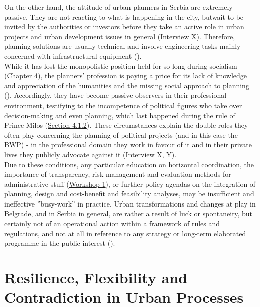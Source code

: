 \documentclass[11pt]{report}
\begin{document}
{{{On the other hand, the attitude of urban planners in Serbia are extremely passive. They are not reacting to what is happening in the city, butwait to be invited by the authorities or investors before they take an active role in urban projects and urban development issues in general 
(\href{InterviewX}{Interview X}).
Therefore, planning solutions are usually technical and involve engineering tasks mainly concerned with infrastructural equipment (\href{Stojkov}{\citealt{stojkov_teorijska_2012}}).
\\

While it has lost the monopolistic position held for so long during socialism (\href{Chapter 4}{Chapter 4}), the planners’ profession is paying a price for its lack of knowledge and appreciation of the humanities and the missing social approach to planning  (\href{Peric}{\citealt{peric_evolution_2016}}).
Accordingly, they have become passive observers in their professional environment, testifying to the incompetence of political figures who take over decision-making and even planning, which last happened during the rule of Prince Milos (\href{Section 4.1.2}{Section 4.1.2}).
These circumstances explain the double roles they often play concerning the planning of  political projects  (and in this case the BWP) - in the professional domain they work in favour of it and in their private lives they publicly advocate against it (\href{InterviewX}{Interview X, Y}).
\\

Due to these conditions, any particular education on horizontal coordination, the importance of transparency, risk management and evaluation methods for administrative stuff 
(\href{Expert Workshop}{Workshop 1}),
or further policy agendas on the integration of planning, design and cost-benefit and feasibility analyses, may be insufficient and ineffective ”busy-work” in practice. Urban transformations and changes at play in Belgrade, and in Serbia in general, are rather a result of luck or spontaneity, but certainly not of an operational action within a framework of rules and regulations, and not at all in reference to any strategy or long-term elaborated programme in the public interest (\href{Vanista}{\citealt{doytchinov_urban_2015}}).

\section{Resilience, Flexibility and Contradiction in Urban Processes}

}}}
\end{document}

